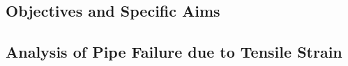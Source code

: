 \begin{spacing}{1.5}
\section{Objectives and Specific Aims}
\subsection{Analysis of Pipe Failure due to Tensile Strain}


\end{spacing}